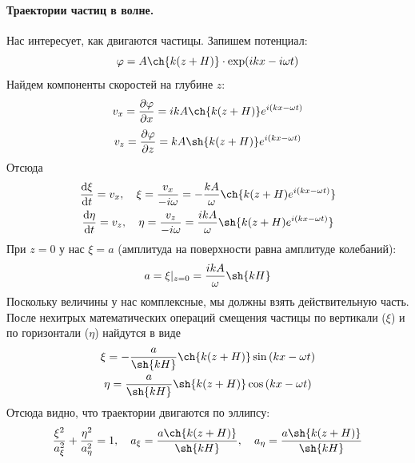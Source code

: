 \paragraph{Траектории частиц в волне. } Нас интересует, как двигаются частицы. Запишем потенциал:
\begin{equation}
	\phi=A\ch{k(z+H)}\cdot\exp(ikx-i\omega t)
\end{equation}
Найдем компоненты скоростей на глубине $z$:
\begin{equation}
    v_x = \pdv{\phi}{x} = ikA\ch{k(z+H)}e^{i(kx-\omega t)}
\end{equation}
\begin{equation}
    v_z = \pdv{\phi}{z} = kA\sh{k(z+H)}e^{i(kx-\omega t)} 
\end{equation}
Отсюда
\begin{gather}
    \dv{\xi}{t} = v_x, \quad \xi=\frac{v_x}{-i\omega} = -\frac{kA}{\omega}\ch{k(z+H) e^{i(kx-\omega t)} }\\
    \dv{\eta}{t} = v_z, \quad \eta=\frac{v_z}{-i\omega} = \frac{ikA}{\omega}\sh{k(z+H) e^{i(kx-\omega t)} } \\
\end{gather}
При $z = 0$ у нас $\xi = a$ (амплитуда на поверхности равна амплитуде колебаний):
\begin{equation}
    a = \xi|_{z = 0} = \frac{ikA}{\omega}\sh{kH}
\end{equation}
Поскольку величины у нас комплексные, мы должны взять действительную часть. После нехитрых математических операций смещения частицы по вертикали ($\xi$) и по горизонтали ($\eta$) найдутся в виде
\begin{gather}
    \xi = -\frac{a}{\sh{kH}}\ch{k(z+H)}\sin{(kx-\omega t)}\\
    \eta = \frac{a}{\sh{kH}}\sh{k(z+H)}\cos{(kx-\omega t)}\\
\end{gather}
Отсюда видно, что траектории двигаются по эллипсу:
\begin{equation}
    \frac{\xi^2}{a_\xi^2}+\frac{\eta^2}{a_\eta^2} = 1, 
    \quad a_\xi = \frac{a\ch{k(z+H)}}{\sh{kH}}
    , \quad a_\eta = \frac{a\sh{k(z+H)}}{\sh{kH}}
\end{equation}


